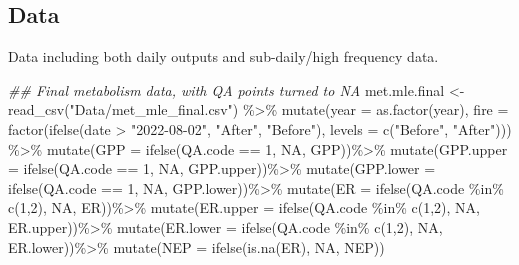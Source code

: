 \documentclass[
  letterpaper,
  DIV=11,
  numbers=noendperiod]{scrartcl}
\newenvironment{Shaded}{\begin{snugshade}}{\end{snugshade}}
\newcommand{\AttributeTok}[1]{\textcolor[rgb]{0.40,0.45,0.13}{#1}}
\newcommand{\ConstantTok}[1]{\textcolor[rgb]{0.56,0.35,0.01}{#1}}
\newcommand{\DecValTok}[1]{\textcolor[rgb]{0.68,0.00,0.00}{#1}}
\newcommand{\DocumentationTok}[1]{\textcolor[rgb]{0.37,0.37,0.37}{\textit{#1}}}
\newcommand{\FunctionTok}[1]{\textcolor[rgb]{0.28,0.35,0.67}{#1}}
\newcommand{\NormalTok}[1]{\textcolor[rgb]{0.00,0.23,0.31}{#1}}
\newcommand{\OtherTok}[1]{\textcolor[rgb]{0.00,0.23,0.31}{#1}}
\newcommand{\SpecialCharTok}[1]{\textcolor[rgb]{0.37,0.37,0.37}{#1}}
\newcommand{\StringTok}[1]{\textcolor[rgb]{0.13,0.47,0.30}{#1}}
\begin{document}
\subsection{Data}\label{data}

Data including both daily outputs and sub-daily/high frequency data.

\begin{Shaded}
\begin{Highlighting}[]
\DocumentationTok{\#\# Final metabolism data, with QA points turned to NA}
\NormalTok{met.mle.final }\OtherTok{\textless{}{-}} \FunctionTok{read\_csv}\NormalTok{(}\StringTok{"Data/met\_mle\_final.csv"}\NormalTok{) }\SpecialCharTok{\%\textgreater{}\%}
 \FunctionTok{mutate}\NormalTok{(}\AttributeTok{year =} \FunctionTok{as.factor}\NormalTok{(year),}
         \AttributeTok{fire =} \FunctionTok{factor}\NormalTok{(}\FunctionTok{ifelse}\NormalTok{(date }\SpecialCharTok{\textgreater{}} \StringTok{"2022{-}08{-}02"}\NormalTok{, }\StringTok{"After"}\NormalTok{, }\StringTok{"Before"}\NormalTok{),}
                       \AttributeTok{levels =} \FunctionTok{c}\NormalTok{(}\StringTok{"Before"}\NormalTok{, }\StringTok{"After"}\NormalTok{))) }\SpecialCharTok{\%\textgreater{}\%}
  \FunctionTok{mutate}\NormalTok{(}\AttributeTok{GPP =} \FunctionTok{ifelse}\NormalTok{(QA.code }\SpecialCharTok{==} \DecValTok{1}\NormalTok{, }\ConstantTok{NA}\NormalTok{, GPP))}\SpecialCharTok{\%\textgreater{}\%}
  \FunctionTok{mutate}\NormalTok{(}\AttributeTok{GPP.upper =} \FunctionTok{ifelse}\NormalTok{(QA.code }\SpecialCharTok{==} \DecValTok{1}\NormalTok{, }\ConstantTok{NA}\NormalTok{, GPP.upper))}\SpecialCharTok{\%\textgreater{}\%}
  \FunctionTok{mutate}\NormalTok{(}\AttributeTok{GPP.lower =} \FunctionTok{ifelse}\NormalTok{(QA.code }\SpecialCharTok{==} \DecValTok{1}\NormalTok{, }\ConstantTok{NA}\NormalTok{, GPP.lower))}\SpecialCharTok{\%\textgreater{}\%}
  \FunctionTok{mutate}\NormalTok{(}\AttributeTok{ER =} \FunctionTok{ifelse}\NormalTok{(QA.code }\SpecialCharTok{\%in\%} \FunctionTok{c}\NormalTok{(}\DecValTok{1}\NormalTok{,}\DecValTok{2}\NormalTok{), }\ConstantTok{NA}\NormalTok{, ER))}\SpecialCharTok{\%\textgreater{}\%}
  \FunctionTok{mutate}\NormalTok{(}\AttributeTok{ER.upper =} \FunctionTok{ifelse}\NormalTok{(QA.code }\SpecialCharTok{\%in\%} \FunctionTok{c}\NormalTok{(}\DecValTok{1}\NormalTok{,}\DecValTok{2}\NormalTok{), }\ConstantTok{NA}\NormalTok{, ER.upper))}\SpecialCharTok{\%\textgreater{}\%}
  \FunctionTok{mutate}\NormalTok{(}\AttributeTok{ER.lower =} \FunctionTok{ifelse}\NormalTok{(QA.code }\SpecialCharTok{\%in\%} \FunctionTok{c}\NormalTok{(}\DecValTok{1}\NormalTok{,}\DecValTok{2}\NormalTok{), }\ConstantTok{NA}\NormalTok{, ER.lower))}\SpecialCharTok{\%\textgreater{}\%}
  \FunctionTok{mutate}\NormalTok{(}\AttributeTok{NEP =} \FunctionTok{ifelse}\NormalTok{(}\FunctionTok{is.na}\NormalTok{(ER), }\ConstantTok{NA}\NormalTok{, NEP))}
  


\end{Highlighting}
\end{Shaded}
\end{document}
